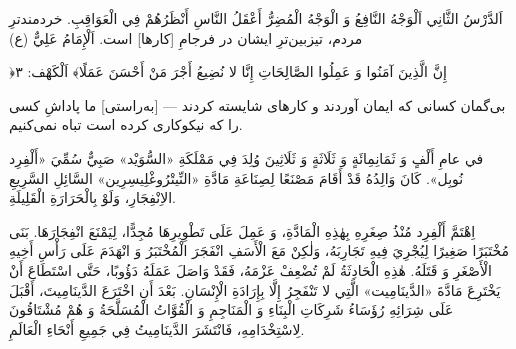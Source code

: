 
\Lesson
  {اَلدَّرْسُ الثَّانِي}
  {اَلْوَجْهُ النَّافِعُ وَ الْوَجْهُ الْمُضِرُّ}
  {أَعْقَلُ النَّاسِ أَنْظَرُهُمْ فِي الْعَوَاقِبِ.}
  {خردمندترِ مردم، تیزبین‌ترِ ایشان در فرجامِ [کارها] است.}
  {اَلْإِمَامُ عَلِيٌّ (ع)}



\begin{JAyat}
\Ar ﴿إِنَّ الَّذِينَ آمَنُوا وَ عَمِلُوا الصَّالِحَاتِ إِنَّا لا نُضِيعُ أَجْرَ
مَنْ أَحْسَنَ عَمَلًا﴾ \hfill اَلْكَهْف: ٣

بی‌گمان کسانی که ایمان آوردند و کارهای شایسته کردند — [به‌راستی] ما پاداشِ
کسی را که نیکوکاری کرده است تباه نمی‌کنیم.
\end{JAyat}

\begin{JNass}
في عامِ أَلْفٍ وَ ثَمَانِمِائَةٍ وَ ثَلَاثَةٍ وَ ثَلَاثِينَ وُلِدَ فِي مَمْلَكَةِ
«السُّوَيْد» صَبِيٌّ سُمِّيَ «أَلْفِرِد نُوبِل». كَانَ وَالِدُهُ قَدْ أَقَامَ
مَصْنَعًا لِصِنَاعَةِ مَادَّةِ «النِّيتْرُوغْلِيسِرِين» السَّائِلِ السَّرِيعِ
الاِنْفِجَارِ، وَلَوْ بِالْحَرَارَةِ الْقَلِيلَةِ.

اِهْتَمَّ أَلْفِرِد مُنْذُ صِغَرِهِ بِهٰذِهِ الْمَادَّةِ، وَ عَمِلَ عَلَى
تَطْوِيرِهَا مُجِدًّا، لِيَمْنَعَ انْفِجَارَهَا. بَنَى مُخْتَبَرًا صَغِيرًا
لِيُجْرِيَ فِيهِ تَجَارِبَهُ، وَلٰكِنْ مَعَ الْأَسَفِ انْفَجَرَ الْمُخْتَبَرُ
وَ انْهَدَمَ عَلَى رَأْسِ أَخِيهِ الْأَصْغَرِ وَ قَتَلَهُ. هٰذِهِ الْحَادِثَةُ
لَمْ تُضْعِفْ عَزْمَهُ، فَقَدْ وَاصَلَ عَمَلَهُ دَؤُوبًا، حَتَّى اسْتَطَاعَ
أَنْ يَخْتَرِعَ مَادَّةَ «الدَّينَامِيت» الَّتِي لا تَنْفَجِرُ إِلَّا
بِإِرَادَةِ الْإِنْسَانِ. بَعْدَ أَنِ اخْتَرَعَ الدَّينَامِيتَ، أَقْبَلَ عَلَى
شِرَائِهِ رُؤَسَاءُ شَرِكَاتِ الْبِنَاءِ وَ الْمَنَاجِمِ وَ الْقُوَّاتُ
الْمُسَلَّحَةُ وَ هُمْ مُشْتَاقُونَ لِاسْتِخْدَامِهِ، فَانْتَشَرَ الدَّينَامِيتُ
فِي جَمِيعِ أَنْحَاءِ الْعَالَمِ.

\end{JNass}

